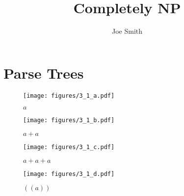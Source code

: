 \documentclass[10pt,reqno,sumlimits]{amsart}
\theoremstyle{plain}
\theoremstyle{definition}
\newcommand{\1}{{\bf 1}}
\numberwithin{equation}{section}
\begin{document}
\title[Assignment 4]{Completely NP}
\author{Joe Smith}



\maketitle



\section {Parse Trees}
\begin{figure}[htbp]
\centerline{
    \mbox{\texttt{[image: figures/3\_1\_a.pdf]}}
  }
  \caption{$a$}
  \label{fig:fit}
\end{figure}

\begin{figure}[htbp]
\centerline{
    \mbox{\texttt{[image: figures/3\_1\_b.pdf]}}
  }
  \caption{$a + a$}
  \label{fig:fit}
\end{figure}

\begin{figure}[htbp]
\centerline{
    \mbox{\texttt{[image: figures/3\_1\_c.pdf]}}
  }
  \caption{$a + a + a$}
  \label{fig:fit}
\end{figure}

\begin{figure}[htbp]
\centerline{
    \mbox{\texttt{[image: figures/3\_1\_d.pdf]}}
  }
  \caption{$((a))$}
  \label{fig:fit}
\end{figure}
\end{document}
